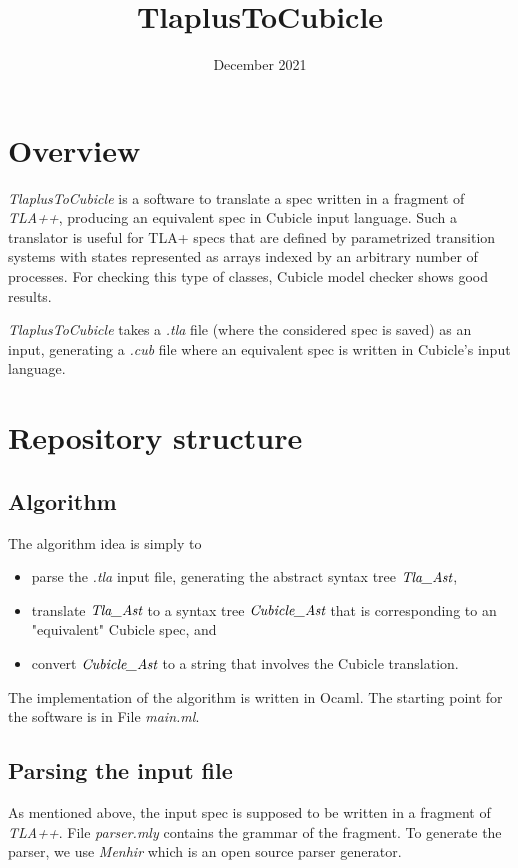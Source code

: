 \documentclass{article}
\title{TlaplusToCubicle}
\date{December 2021}
\begin{document}
\maketitle

\section*{Overview}

\textit{TlaplusToCubicle} is a software to translate a spec written in a fragment of \textit{TLA++}, producing an equivalent spec in Cubicle input language. Such a translator is useful for TLA+ specs that are defined by parametrized transition systems with states represented as arrays indexed by an arbitrary number of processes. For checking this type of classes, Cubicle model checker shows good results.

 \textit{TlaplusToCubicle} takes a \textit{.tla} file (where the considered spec  is saved) as an input, generating a  \textit{.cub} file where an equivalent spec is written in Cubicle's input language. 

\section*{Repository structure}

\subsection*{Algorithm}

The algorithm idea is simply to 
\begin{itemize}
\item parse the \textit{.tla} input file, generating the abstract syntax tree $\emph{Tla\_Ast}$, 
\item translate $\emph{Tla\_Ast}$ to a syntax tree $\emph{Cubicle\_Ast}$ that is corresponding to an "equivalent" Cubicle spec, and 
\item convert $\emph{Cubicle\_Ast}$ to a string that involves the Cubicle translation. 

\end{itemize}

The implementation of the algorithm is written in Ocaml. The starting point for the software is in File \emph{main.ml}.
\subsection*{Parsing the input file }
As mentioned above, the input spec is supposed to be written in a fragment of \textit{TLA++}. File \textit{parser.mly} contains the grammar of the fragment. To generate the parser, we use \textit{Menhir} which is an open source parser generator. 
\end{document}
